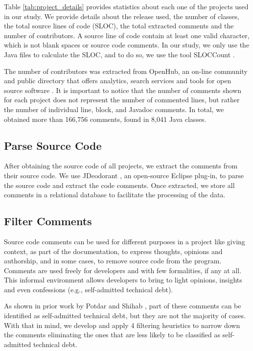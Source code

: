 Table \ref{tab:project_details} provides statistics about each one of the projects used in our study. We provide details about the release used, the number of classes, the total source lines of code (SLOC), the total extracted comments and the number of contributors. A source line of code contain at least one valid character, which is not blank spaces or source code comments. In our study, we only use the Java files to calculate the SLOC, and to do so, we use the tool SLOCCount \cite{wheeler2004:home}. 

The number of contributors was extracted from OpenHub, an on-line community and public directory that offers analytics, search services and tools for open source software \cite{Openhub:home}. It is important to notice that the number of comments shown for each project does not represent the number of commented lines, but rather the number of individual line, block, and Javadoc comments. In total, we obtained more than 166,756 comments, found in 8,041 Java classes.
 
\subsection{Parse Source Code} %
\label{sub:parse_source_code}
After obtaining the source code of all projects, we extract the comments from their source code. We use JDeodorant \cite{Tsantalis2008CSMR}, an open-source Eclipse plug-in, to parse the source code and extract the code comments. Once extracted, we store all comments in a relational database to facilitate the processing of the data. 

\subsection{Filter Comments} %
\label{sub:filter_comments}

Source code comments can be used for different purposes in a project like giving context, as part of the documentation, to express thoughts, opinions and authorship, and in some cases, to remove source code from the program. Comments are used freely for developers and with few formalities, if any at all. This informal environment allows developers to bring to light opinions, insights and even confessions (e.g., self-admitted technical debt). 

As shown in prior work by Potdar and Shihab \cite{Potdar2014ICSME}, part of these comments can be identified as self-admitted technical debt, but they are not the majority of cases. With that in mind, we develop and apply 4 filtering heuristics to narrow down the comments eliminating the ones that are less likely to be classified as self-admitted technical debt.

